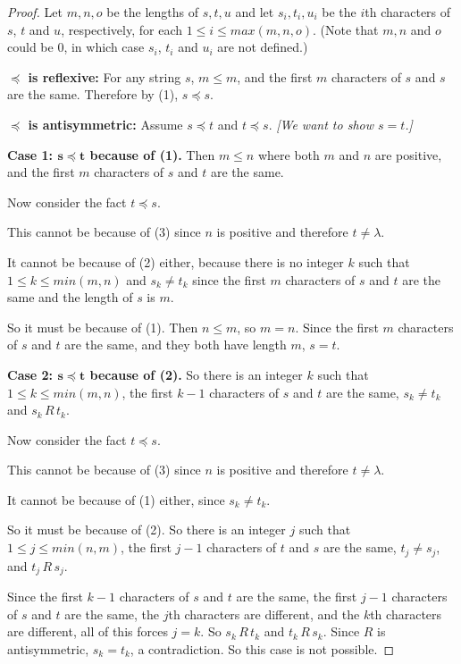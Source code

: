 \documentclass[14pt]{extarticle}
\begin{document}
\begin{proof}
Let $m,n,o$ be the lengths of $s,t,u$ and let \(s_i, t_i, u_i\) be the $i$th characters of $s$, $t$ and $u$, 
respectively, for each \(1 \leq i \leq max(m, n, o)\). (Note that $m,n$ and $o$ could be 0, in which case \(s_i\), \(t_i\) and \(u_i\) are not defined.)

{\bf \(\bm{\preceq}\) is reflexive:} For any string $s$, \(m \leq m\), and the first $m$ characters of $s$ and $s$ 
are the same. Therefore by (1), \(s \preceq s\).

{\bf \(\bm{\preceq}\) is antisymmetric:} Assume \(s \preceq t\) and \(t \preceq s\). {\it [We want to show $s=t$.]} 

{\bf Case 1: \(\bm{s \preceq t}\) because of (1).} Then \(m \leq n\) where both $m$ and $n$ are positive, and the first 
$m$ characters of $s$ and $t$ are the same. 

Now consider the fact \(t \preceq s\). 

This cannot be because of (3) since $n$ is positive and therefore \(t \neq \lambda\).

It cannot be because of (2) either, because there is no integer $k$ such that \(1 \leq k \leq min(m,n)\) and \(s_k \neq t_k\) since the first $m$ characters of $s$ and $t$ are the same and the length of $s$ is $m$.

So it must be because of (1). Then \(n \leq m\), so \(m = n\). Since the first $m$ characters of $s$ and $t$ are the 
same, and they both have length $m$, \(s = t\).

{\bf Case 2: \(\bm{s \preceq t}\) because of (2).} So there is an integer $k$ such that \(1 \leq k \leq min(m,n)\), the 
first $k-1$ characters of $s$ and $t$ are the same, \(s_k \neq t_k\) and \(s_k \,R\, t_k\). 

Now consider the fact \(t \preceq s\). 

This cannot be because of (3) since $n$ is positive and therefore \(t \neq \lambda\). 

It cannot be because of (1) either, since \(s_k \neq t_k\). 

So it must be because of (2). So there is an integer $j$ such that \(1 \leq j \leq min(n,m)\), the first $j-1$ 
characters of $t$ and $s$ are the same, \(t_j \neq s_j\), and \(t_j \,R\, s_j\). 

Since the first $k-1$ characters of $s$ and $t$ are the same, the first $j-1$ characters of $s$ and $t$ are the 
same, the $j$th characters are different, and the $k$th characters are different, all of this forces $j=k$. So 
\(s_k \,R\, t_k\) and \(t_k \,R\, s_k\). Since $R$ is antisymmetric, \(s_k = t_k\), a contradiction. 
So this case is not possible.


\end{proof}
\end{document}
